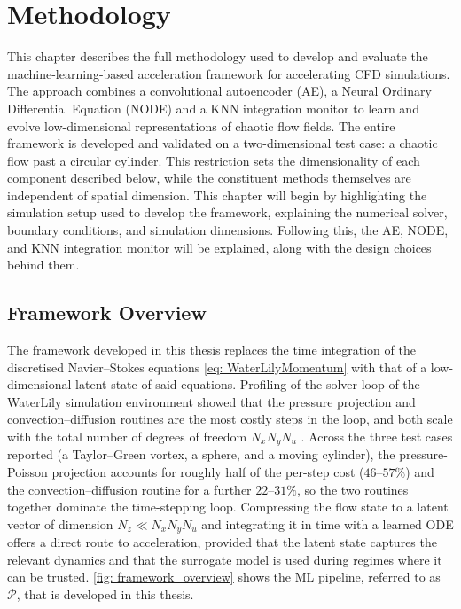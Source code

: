 \chapter{Methodology}
\label{chap: Methodology}

This chapter describes the full methodology used to develop and evaluate the machine-learning-based acceleration framework for accelerating CFD simulations. The approach combines a convolutional autoencoder (AE), a Neural Ordinary Differential Equation (NODE) and a KNN integration monitor to learn and evolve low-dimensional representations of chaotic flow fields. The entire framework is developed and validated on a two-dimensional test case: a chaotic flow past a circular cylinder. This restriction sets the dimensionality of each component described below, while the constituent methods themselves are independent of spatial dimension. This chapter will begin by highlighting the simulation setup used to develop the framework, explaining the numerical solver, boundary conditions, and simulation dimensions. Following this, the AE, NODE, and KNN integration monitor will be explained, along with the design choices behind them.

\section{Framework Overview}
\label{sect: Framework Overview}

The framework developed in this thesis replaces the time integration of the discretised Navier--Stokes equations \eqref{eq: WaterLilyMomentum} with that of a low-dimensional latent state of said equations. Profiling of the solver loop of the WaterLily simulation environment showed that the pressure projection and convection--diffusion routines are the most costly steps in the loop, and both scale with the total number of degrees of freedom $N_x N_y N_u$ \cite{Weymouth2025}. Across the three test cases reported (a Taylor--Green vortex, a sphere, and a moving cylinder), the pressure-Poisson projection accounts for roughly half of the per-step cost ($46$--$57\%$) and the convection--diffusion routine for a further $22$--$31\%$, so the two routines together dominate the time-stepping loop. Compressing the flow state to a latent vector of dimension $N_z \ll N_x N_y N_u$ and integrating it in time with a learned ODE offers a direct route to acceleration, provided that the latent state captures the relevant dynamics and that the surrogate model is used during regimes where it can be trusted. \autoref{fig: framework_overview} shows the ML pipeline, referred to as $\mathcal{P}$, that is developed in this thesis. 

